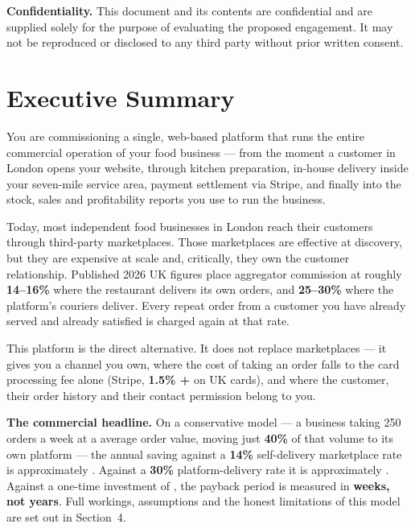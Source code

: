 \documentclass[11pt,a4paper]{article}
\begin{document}
\vspace{4pt}
{\color{brandgrey}\footnotesize
\textbf{Confidentiality.} This document and its contents are confidential and are supplied
solely for the purpose of evaluating the proposed engagement. It may not be reproduced or
disclosed to any third party without prior written consent.}

\clearpage

{\hypersetup{linkcolor=brandink}
\renewcommand{\contentsname}{\color{brandnavy}Contents}
\tableofcontents}

\clearpage
\section{Executive Summary}

You are commissioning a single, web-based platform that runs the entire commercial
operation of your food business --- from the moment a customer in London opens your
website, through kitchen preparation, in-house delivery inside your seven-mile service
area, payment settlement via Stripe, and finally into the stock, sales and profitability
reports you use to run the business.

Today, most independent food businesses in London reach their customers through
third-party marketplaces. Those marketplaces are effective at discovery, but they are
expensive at scale and, critically, they own the customer relationship. Published 2026
UK figures place aggregator commission at roughly \textbf{14--16\%} where the restaurant
delivers its own orders, and \textbf{25--30\%} where the platform's couriers deliver.
Every repeat order from a customer you have already served and already satisfied is
charged again at that rate.

This platform is the direct alternative. It does not replace marketplaces --- it
gives you a channel you own, where the cost of taking an order falls to the card
processing fee alone (Stripe, \textbf{1.5\% + } on UK cards), and where
the customer, their order history and their contact permission belong to you.

\begin{tealbox}
\textbf{The commercial headline.} On a conservative model --- a business taking
250 orders a week at a  average order value, moving just \textbf{40\%} of that
volume to its own platform --- the annual saving against a \textbf{14\%} self-delivery
marketplace rate is approximately \textbf{}. Against a \textbf{30\%}
platform-delivery rate it is approximately \textbf{}. Against a one-time
investment of , the payback period is measured in \textbf{weeks, not years}.
Full workings, assumptions and the honest limitations of this model are set out in Section~4.
\end{tealbox}
\end{document}
